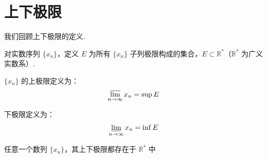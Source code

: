 \section{上下极限}
我们回顾上下极限的定义.
\begin{definition}
	对实数序列 $\{x_n\}$，定义 $E$ 为所有 $\{x_n\}$ 子列极限构成的集合，$E \subset \mathbb{R}^*$（$\mathbb{R}^*$ 为广义实数系）.
	
	$\{x_n\}$ 的上极限定义为：
	\[
	\varlimsup_{n \to \infty} x_n = \sup E
	\]
	
	下极限定义为：
	\[
	\varliminf_{n \to \infty} x_n = \inf E
	\]
	
\end{definition}
\begin{proposition}
	任意一个数列 $\{x_n\}$，其上下极限都存在于 $\mathbb{R}^*$ 中
\end{proposition}
